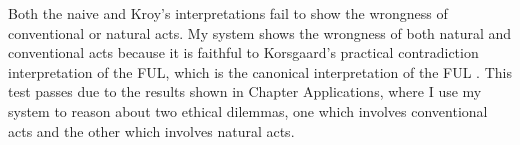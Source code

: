 \begin{isabellebody}
\begin{isamarkuptext}
Both the naive and Kroy's interpretations fail to show the wrongness of conventional or natural acts. 
My system shows the wrongness of both natural and conventional acts because it is faithful to Korsgaard's 
practical contradiction interpretation of the FUL, which is the canonical interpretation of the 
FUL \citep{KorsgaardFUL}. This test passes due to the results shown in Chapter Applications, where I
use my system to reason about two ethical dilemmas, one which involves conventional acts and the other which
involves natural acts.%
\end{isamarkuptext}\isamarkuptrue%
%
\isadelimproof
%
\endisadelimproof
%
\isatagproof
%
\endisatagproof
{\isafoldproof}%
%
\isadelimproof
%
\endisadelimproof
%
\isadelimtheory
%
\endisadelimtheory
%
\isatagtheory
%
\endisatagtheory
{\isafoldtheory}%
%
\isadelimtheory
%
\endisadelimtheory
%
\end{isabellebody}%
\endinput
